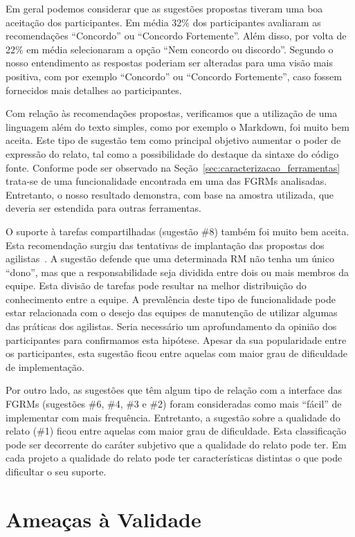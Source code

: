 Em geral podemos considerar que as sugestões propostas tiveram uma boa aceitação
dos participantes. Em média 32\% dos participantes avaliaram as recomendações
``Concordo'' ou ``Concordo Fortemente''.  Além disso, por volta de 22\% em média
selecionaram a opção ``Nem concordo ou discordo''. Segundo o nosso entendimento
as respostas poderiam ser alteradas para uma visão mais positiva, com por
exemplo ``Concordo'' ou ``Concordo Fortemente'', caso fossem fornecidos mais
detalhes ao participantes.

Com relação às recomendações propostas, verificamos que a utilização de uma
linguagem além do texto simples, como por exemplo o Markdown, foi muito bem
aceita. Este tipo de sugestão tem como principal objetivo aumentar o poder
de expressão do relato, tal como a possibilidade do destaque da sintaxe do
código fonte. Conforme pode ser observado na
Seção~\ref{sec:caracterizacao_ferramentas} trata-se de uma funcionalidade
encontrada em uma das FGRMs analisadas. Entretanto, o nosso resultado demonstra,
com base na amostra utilizada, que deveria ser estendida para outras
ferramentas.

O suporte à tarefas compartilhadas (sugestão \#8) também foi muito bem aceita.
Esta recomendação surgiu das tentativas de implantação das propostas dos
agilistas~\cite{svensson2005introducing}. A sugestão defende que uma
determinada RM não tenha um único ``dono'', mas que a responsabilidade seja
dividida entre dois ou mais membros da equipe. Esta divisão de tarefas pode
resultar na melhor distribuição do conhecimento entre a equipe. A prevalência
deste tipo de funcionalidade pode estar relacionada com o desejo das equipes de
manutenção de utilizar algumas das práticas dos agilistas. Seria necessário um
aprofundamento da opinião dos participantes para confirmamos esta hipótese.
Apesar da sua popularidade entre os participantes, esta sugestão ficou entre
aquelas com maior grau de dificuldade de implementação.

Por outro lado, as sugestões que têm algum tipo de relação com a interface das
FGRMs (sugestões \#6, \#4, \#3 e \#2) foram consideradas como mais ``fácil'' de
implementar com mais frequência. Entretanto, a sugestão sobre a qualidade do
relato (\#1) ficou entre aquelas com maior grau de dificuldade. Esta
classificação pode ser decorrente do caráter subjetivo que a qualidade do relato
pode ter. Em cada projeto a qualidade do relato pode ter características
distintas o que pode dificultar o seu suporte.

\section{Ameaças à Validade}
\label{sec:sug_melhoria_ameacas}

